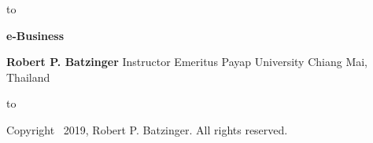 \thispagestyle{empty}
\vbox to 
\newpage
\thispagestyle{empty}
\frontmatter
\let\maketitle\oldmaketitle
\vfill
\vfill
\begin{center}
\noindent\LARGE\textbf{e-Business}\parfillskip=0pt\par
\bigskip
\noindent\large\textbf{Robert P. Batzinger}\newline
Instructor Emeritus\newline
Payap University\newline
Chiang Mai, Thailand\parfillskip=0pt\par
\end{center}
\vfill
\vfill
\vfill
\hbox to 
\vfill
\null
\newpage
\vfill
\begin{center}
\noindent  Copyright \textcopyright\ 2019, Robert P. Batzinger. All rights reserved.\parfillskip=0pt\par
\end{center}
\vfill
\vfill
\newpage
\frontmatter

